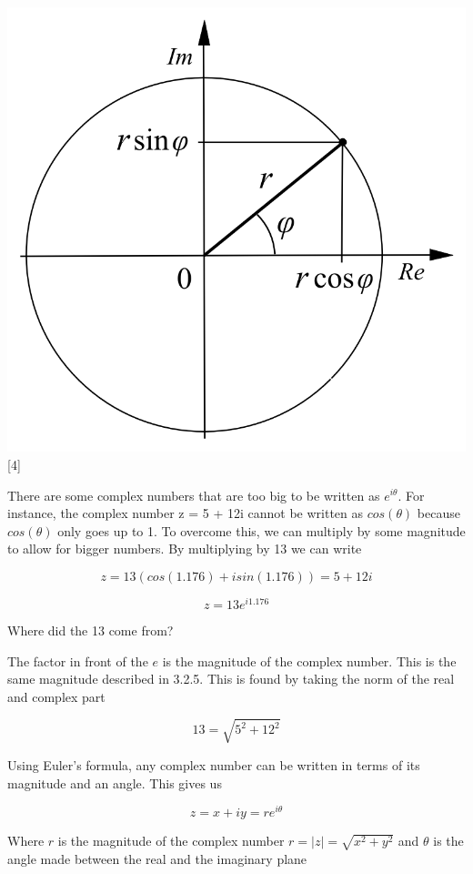 \documentclass{book}
\begin{document}
\includegraphics{images/Polar_Argand-diagram.png}
[4]

There are some complex numbers that are too big to be written as $e^{i\theta}$. For instance, the complex number z = 5 + 12i cannot be written as $cos(\theta)$ because $cos(\theta)$ only goes up to 1. To overcome this, we can multiply by some magnitude to allow for bigger numbers. By multiplying by 13 we can write 

$$ z = 13(cos(1.176) + i sin(1.176) )= 5 + 12i $$

$$ z = 13e^{i 1.176}$$

Where did the 13 come from? 

The factor in front of the $e$ is the magnitude of the complex number. This is the same magnitude described in 3.2.5. This is found by taking the norm of the real and complex part 

$$ 13 = \sqrt{ 5^2 + 12^2} $$


Using Euler's formula, any complex number can be written in terms of its magnitude and an angle. This gives us 

$$z = x + iy = re^{i\theta}$$ 

Where $r$ is the magnitude of the complex number $r = |z| = \sqrt{x^2 + y^2}$ and $\theta$ is the angle made between the real and the imaginary plane
\end{document}
